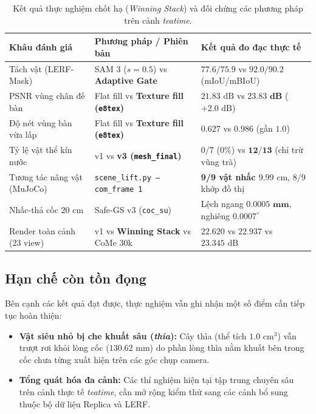 \begin{table}[H]
\centering
\caption{Kết quả thực nghiệm chốt hạ (\textit{Winning Stack}) và đối chứng các phương pháp trên cảnh \textit{teatime}.}
\label{tab:safegs_v3_comparison}
\begin{tabular}{@{}lll@{}}
\toprule
\textbf{Khâu đánh giá} & \textbf{Phương pháp / Phiên bản} & \textbf{Kết quả đo đạc thực tế} \\ \midrule
Tách vật (LERF-Mask) & SAM 3 ($s=0.5$) vs \textbf{Adaptive Gate} & $77.6 / 75.9$ vs $\mathbf{92.0 / 90.2}$ (mIoU/mBIoU) \\
PSNR vùng chân đế bàn & Flat fill vs \textbf{Texture fill (\texttt{e8tex})} & $21.83\text{ dB}$ vs $\mathbf{23.83\text{ dB}}$ ($+2.0\text{ dB}$) \\
Độ nét vùng bàn vừa lấp & Flat fill vs \textbf{Texture fill (\texttt{e8tex})} & $0.627$ vs $\mathbf{0.986}$ (gần $1.0$) \\
Tỷ lệ vật thể kín nước & v1 vs \textbf{v3 (\texttt{mesh\_final})} & $0/7$ ($0\%$) vs $\mathbf{12/13}$ (chỉ trừ vũng trà) \\
Tương tác nâng vật (MuJoCo) & \texttt{scene\_lift.py --com\_frame 1} & \textbf{9/9 vật nhấc $9.99\text{ cm}$}, 8/9 khớp đồ thị \\
Nhấc-thả cốc $20\text{ cm}$ & Safe-GS v3 (\texttt{coc\_su}) & Lệch ngang $\mathbf{0.0005\text{ mm}}$, nghiêng $\mathbf{0.0007^\circ}$ \\
Render toàn cảnh (23 view) & v1 vs \textbf{Winning Stack} vs CoMe 30k & $22.620$ vs $\mathbf{22.937}$ vs $23.345\text{ dB}$ \\ \bottomrule
\end{tabular}
\end{table}

\subsection{Hạn chế còn tồn đọng}
Bên cạnh các kết quả đạt được, thực nghiệm vẫn ghi nhận một số điểm cần tiếp tục hoàn thiện:
\begin{itemize}
    \item \textbf{Vật siêu nhỏ bị che khuất sâu (\textit{thia}):} Cây thìa (thể tích $1.0\text{ cm}^3$) vẫn trượt rơi khỏi lòng cốc ($130.62\text{ mm}$) do phần lòng thìa nằm khuất bên trong cốc chưa từng xuất hiện trên các góc chụp camera.
    \item \textbf{Tổng quát hóa đa cảnh:} Các thí nghiệm hiện tại tập trung chuyên sâu trên cảnh thực tế \textit{teatime}, cần mở rộng kiểm thử sang các cảnh bổ sung thuộc bộ dữ liệu Replica và LERF.
\end{itemize}
